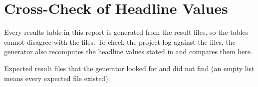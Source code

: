 \chapter{Cross-Check of Headline Values}\label{app:crosscheck}

Every results table in this report is generated from the result files, so the tables cannot disagree with the files.
To check the project log against the files, the generator also recomputes the headline values stated in
 and compares them here.



Expected result files that the generator looked for and did not find (an empty list means every expected file
existed):


